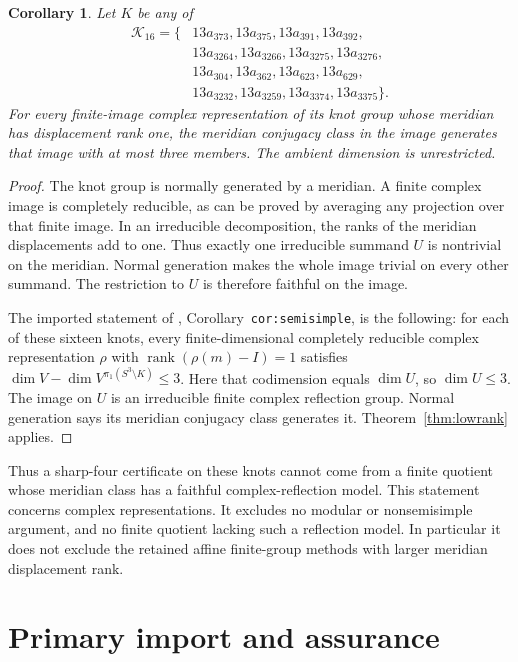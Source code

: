 \documentclass[11pt]{article}
\newtheorem{corollary}[lemma]{Corollary}
\newcommand{\rk}{\operatorname{rank}}
\begin{document}
\begin{corollary}\label{cor:knots}
Let $K$ be any of
\[
\begin{aligned}
\mathcal K_{16}=\{&
13a_{373},13a_{375},13a_{391},13a_{392},\\
&13a_{3264},13a_{3266},13a_{3275},13a_{3276},\\
&13a_{304},13a_{362},13a_{623},13a_{629},\\
&13a_{3232},13a_{3259},13a_{3374},13a_{3375}\}.
\end{aligned}
\]
For every finite-image complex representation of its knot group whose
meridian has displacement rank one, the meridian conjugacy class in
the image generates that image with at most three members.
The ambient dimension is unrestricted.
\end{corollary}
\begin{proof}
The knot group is normally generated by a meridian.
A finite complex image is completely reducible, as can be proved by
averaging any projection over that finite image.
In an irreducible decomposition, the ranks of the meridian
displacements add to one. Thus exactly one irreducible summand $U$
is nontrivial on the meridian. Normal generation makes the whole image
trivial on every other summand.
The restriction to $U$ is therefore faithful on the image.

The imported statement of ,
Corollary~\texttt{cor:semisimple}, is the following: for each of these
sixteen knots, every finite-dimensional completely reducible complex
representation $\rho$ with $\rk(\rho(m)-I)=1$ satisfies
$\dim V-\dim V^{\pi_1(S^3\setminus K)}\le3$.
Here that codimension equals $\dim U$, so $\dim U\le3$.
The image on $U$ is an irreducible finite complex reflection group.
Normal generation says its meridian conjugacy class generates it.
Theorem~\ref{thm:lowrank} applies.
\end{proof}

Thus a sharp-four certificate on these knots cannot come from a finite
quotient whose meridian class has a faithful complex-reflection model.
This statement concerns complex representations. It excludes no modular
or nonsemisimple argument, and no finite quotient lacking such a
reflection model. In particular it does not exclude the retained affine
finite-group methods with larger meridian displacement rank.

\section*{Primary import and assurance}
\end{document}
